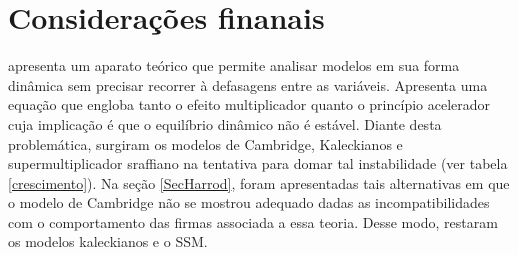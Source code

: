 \section{Considerações finanais}
\label{Concl1}


\textcite{harrod_essay_1939} apresenta um aparato teórico que permite analisar modelos em sua forma dinâmica sem precisar recorrer à defasagens entre as variáveis. Apresenta uma equação que engloba tanto o efeito multiplicador quanto o princípio acelerador cuja implicação é que o equilíbrio dinâmico não é estável. Diante desta problemática, surgiram os modelos de Cambridge, Kaleckianos e supermultiplicador sraffiano na tentativa para domar tal instabilidade (ver tabela \ref{crescimento}). Na seção \ref{SecHarrod}, foram apresentadas tais alternativas em que o modelo de Cambridge não se mostrou adequado dadas as incompatibilidades com o comportamento das firmas associada a essa teoria. Desse modo, restaram os modelos kaleckianos e o SSM. 

